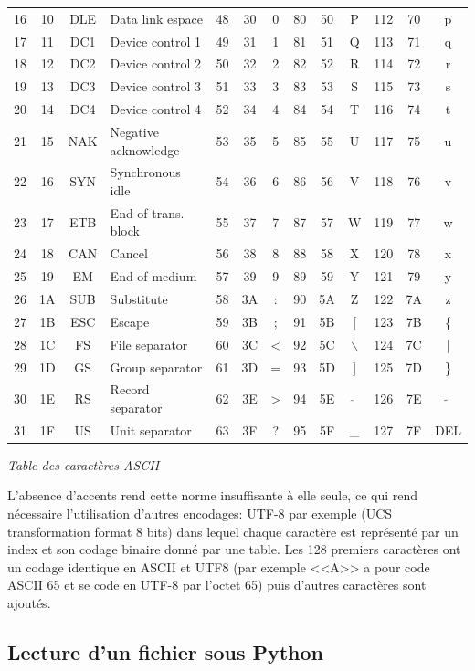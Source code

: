 \documentclass[10pt,fleqn]{article} %
\begin{document}
\begin{center}
{\begin{tabular}{|ccc l||ccc||ccc||ccc|}
16&10&DLE& Data link espace 		&48&30&0 	&80&50& P 	& 112 &70& p \\
17&11&DC1& Device control 1		&49&31&1 	&81&51& Q 	& 113 &71& q \\
18&12&DC2 &Device control 2		&50&32&2 	&82&52& R 	& 114 &72& r \\
19&13&DC3 &Device control 3		&51&33&3 	&83&53& S 	& 115 &73& s \\
20&14&DC4 &Device control 4		&52&34&4 	&84&54& T 	& 116 &74& t \\
21&15&NAK &Negative acknowledge	&53&35&5 	&85&55& U 	& 117 &75& u \\
22&16&SYN &Synchronous idle 		&54&36&6 	&86&56& V 	& 118 &76& v \\
23&17&ETB &End of trans. block 		&55&37&7 	&87&57& W 	& 119 &77& w \\
24&18&CAN &Cancel 				&56&38&8 	&88&58& X 	& 120 &78& x \\
25&19&EM &End of medium 			&57&39&9 	&89&59& Y 	& 121 &79& y \\
26&1A&SUB &Substitute 			&58&3A&: 	&90&5A& Z 	& 122 &7A& z \\
27&1B&ESC &Escape 				&59&3B&; 	&91&5B& [ 	& 123 &7B& \{ \\
28&1C&FS &File separator 			&60&3C&< 	&92&5C& $\backslash$ & 124 &7C& |\\
29&1D&GS &Group separator 		&61&3D&= 	&93&5D& ] 	& 125 &7D& \}\\
30&1E&RS &Record separator 		&62&3E&> 	&94&5E& $\hat{}$& 126 &7E& $\tilde{}$ \\
31&1F&US &Unit separator 			&63&3F&? 	&95&5F& \_ & 127 &7F& DEL\\
\hline
\end{tabular}}

\textit{Table des caractères ASCII}
\end{center}

L'absence d'accents rend cette norme insuffisante à elle seule,
ce qui rend nécessaire l'utilisation d'autres encodages: UTF-8 par exemple (UCS transformation format 8 bits) dans lequel chaque caractère est représenté par un index et son codage binaire donné par une table. Les 128 premiers caractères ont un codage identique en ASCII et UTF8 (par exemple <<A>> a pour code ASCII 65 et se code en UTF-8 par l'octet 65) puis d'autres caractères sont ajoutés.


\subsection{Lecture d'un fichier sous Python}
\end{document}
